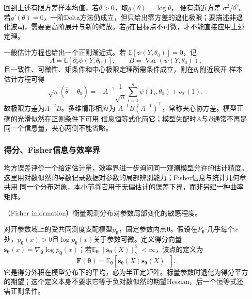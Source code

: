 回到上述有限方差样本均值，若\(\theta>0\)，取\(g(\theta)=\log\theta\)，
便有渐近方差
\(\sigma^2/\theta^2\)。若\(g'(\theta)=0\)，一阶Delta方法仍成立，但只给出零方差的退化极限；要描述非退化波动，需要更高阶展开与新的缩放。若\(g\)在目标点不可微，才不能直接应用上述定理。

一般估计方程也给出一个正则渐近式。若
\(\mathbb{E}[\psi(Y,\theta_0)]=0\)，记
\[
  A=\mathbb{E}[\partial_\theta\psi(Y,\theta_0)],
  \qquad B=\operatorname{Var}(\psi(Y,\theta_0)),
\]
且一致性、可微性、矩条件和中心极限定理所需条件成立，则在\(\theta_0\)附近展开
样本估计方程可得
\[
  \sqrt n(\widehat\theta-\theta_0)
  =
  -A^{-1}\frac1{\sqrt n}\sum_{i=1}^n\psi(Y_i,\theta_0)
  +o_{\mathbb{P}}(1),
\]
故极限方差为\(A^{-2}B\)。多维情形相应为
\(A^{-1}B(A^{-1})^\top\)，常称夹心协方差。模型正确的光滑似然在正则条件下可用
信息恒等式化简它；模型失配时\(A\)与\(B\)通常不再是同一个信息量，夹心两侧不能省略。

\subsubsection{得分、Fisher信息与效率界}

均方误差评价一个给定估计量，效率界进一步询问同一观测模型允许的估计精度。
这里用对数似然的导数记录数据对参数的局部辨别能力；Fisher信息与统计几何章共用
同一个分布对象，本小节将它用于无偏估计的误差下界，而非另建一种曲率矩阵。

（Fisher information）衡量观测分布对参数局部变化的敏感程度。

\begin{definition}[Fisher信息矩阵]
\label{def:information-fisher-matrix}
对开参数域上的受共同测度支配模型\(p_{\bm\theta}\)，固定参数内点\(\bm\theta\)。假设在\(P_{\bm\theta}\)-几乎每个\(x\)处，\(p_{\bm\theta}(x)>0\)且\(\log p_{\bm\theta}(x)\)关于参数可微。定义得分向量\(\bm s_{\bm\theta}(x)=\nabla_{\bm\theta}\log p_{\bm\theta}(x)\)；若\(\mathbb E_{\bm\theta}\lVert\bm s_{\bm\theta}(X)\rVert_2^2<\infty\)，该点的定义为
\begin{equation}
  \bm{F}(\bm{\theta})
  =
  \mathbb{E}_{\bm{\theta}}\!\left[
    \bm{s}_{\bm{\theta}}(X)
    \bm{s}_{\bm{\theta}}(X)^{\top}
  \right].
  \label{eq:information-fisher-matrix}
\end{equation}
它是得分外积在模型分布下的平均，必为半正定矩阵。标量参数时退化为得分平方的期望；这个定义本身不要求它等于负对数似然的期望Hessian，后一个恒等式还需正则条件。
\end{definition}

